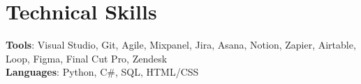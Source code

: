 \section{Technical Skills}
\begin{itemize}[leftmargin=0.15in, label={}]
    \small{
      \item{
      \textbf{Tools}{: Visual Studio, Git, Agile, Mixpanel, Jira, Asana, Notion, Zapier, Airtable, Loop, Figma, Final Cut Pro, Zendesk} \\
      \textbf{Languages}{: Python, C\#, SQL, HTML/CSS} \\
      }
    }
  \end{itemize}
